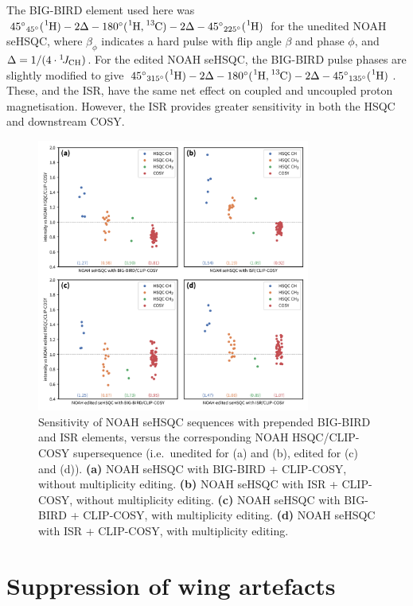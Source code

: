The BIG-BIRD element used here was ${45^\circ}_{45^\circ}(\proton{}) - 2\Delta - 180^\circ(\proton{},\carbon{}) - 2\Delta - {45^\circ}_{225^\circ}(\proton{})$ for the unedited NOAH seHSQC, where $\beta_\phi$ indicates a hard pulse with flip angle $\beta$ and phase $\phi$, and $\Delta = 1/(4\cdot\onejch)$.
For the edited NOAH seHSQC, the BIG-BIRD pulse phases are slightly modified to give ${45^\circ}_{315^\circ}(\proton{}) - 2\Delta - 180^\circ(\proton{},\carbon{}) - 2\Delta - {45^\circ}_{135^\circ}(\proton{})$.
These, and the ISR, have the same net effect on coupled and uncoupled proton magnetisation.
However, the ISR provides greater sensitivity in both the HSQC and downstream COSY.

\begin{figure}
    \centering
    \includegraphics[width=0.8\textwidth]{./figures/bigbird.png}
    \caption{
        Sensitivity of NOAH seHSQC sequences with prepended BIG-BIRD and ISR elements, versus the corresponding NOAH HSQC/CLIP-COSY supersequence (i.e.\ unedited for (a) and (b), edited for (c) and (d)).
        \andro{}
        \textbf{(a)} NOAH seHSQC with BIG-BIRD + CLIP-COSY, without multiplicity editing.
        \textbf{(b)} NOAH seHSQC with ISR + CLIP-COSY, without multiplicity editing.
        \textbf{(c)} NOAH seHSQC with BIG-BIRD + CLIP-COSY, with multiplicity editing.
        \textbf{(d)} NOAH seHSQC with ISR + CLIP-COSY, with multiplicity editing.
    }
    \label{fig:bigbird}
\end{figure}


\section{Suppression of wing artefacts}

